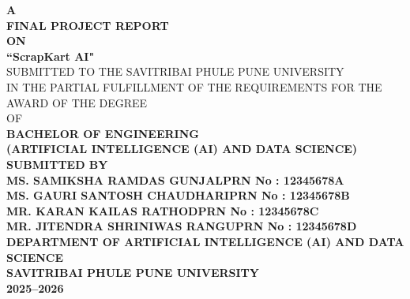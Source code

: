 \begin{titlepage}
    \vspace*{1cm}
    \begin{center}
    {\Large \textbf{A}}\\[0.5cm]
    {\Large \textbf{ FINAL PROJECT REPORT}}\\[0.5cm]
    {\Large \textbf{ ON}}\\[0.5cm]
        {\huge \textbf{``ScrapKart AI"}}\\[1.5em]
        {\normalsize SUBMITTED TO THE SAVITRIBAI PHULE PUNE UNIVERSITY}\\
        {\normalsize IN THE PARTIAL FULFILLMENT OF THE REQUIREMENTS FOR THE AWARD OF THE DEGREE}\\[0.75em]
        
        {\normalsize OF}\\[0.5em]
        
        {\large \textbf{BACHELOR OF ENGINEERING\\(ARTIFICIAL INTELLIGENCE (AI) AND DATA SCIENCE)}}\\[1.5em]
        {\large \textbf{SUBMITTED BY}}\\[1.5em]
        
    {\normalsize \textbf{MS. SAMIKSHA RAMDAS GUNJAL}}\hfill {\normalsize \textbf{PRN No : 12345678A }}\\
    {\normalsize \textbf{MS. GAURI SANTOSH CHAUDHARI}}\hfill {\normalsize \textbf{PRN No : 12345678B }}\\
    {\normalsize \textbf{MR. KARAN KAILAS RATHOD}}\hfill {\normalsize \textbf{PRN No : 12345678C }}\\
     {\normalsize \textbf{MR. JITENDRA SHRINIWAS RANGU}}\hfill {\normalsize \textbf{PRN No : 12345678D }}\\[0.3em]
        \centering
        \vspace{2cm}
        {\large \textbf{DEPARTMENT OF ARTIFICIAL INTELLIGENCE (AI) AND DATA SCIENCE}}\\[1em]
        {\normalsize \textbf{SAVITRIBAI PHULE PUNE UNIVERSITY\\
        2025--2026}}
    \end{center}
    \vfill
\end{titlepage}

\newpage 

